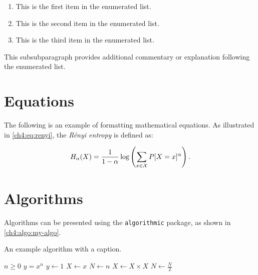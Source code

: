 \begin{enumerate}[itemindent=\subsubparitemindent]
    \item This is the first item in the enumerated list.
    \item This is the second item in the enumerated list.
    \item This is the third item in the enumerated list.
\end{enumerate}

\begin{subsubparagraph}
This subsubparagraph provides additional commentary or explanation following the enumerated list.
\end{subsubparagraph}
    

\section{Equations}
\begin{paragraph}
The following is an example of formatting mathematical equations. As illustrated in \autoref{ch4:eq:renyi}, the {\em R\'enyi entropy} is defined as:
\end{paragraph}

\begin{equation}
\label{ch4:eq:renyi}
H_{\alpha}(X) =
\frac{1}{1-\alpha}
\log \left(\sum_{x \in {\cal X}}P[X=x]^{\alpha} \right) .
\end{equation}

\section{Algorithms}
\begin{paragraph}
Algorithms can be presented using the \texttt{algorithmic} package, as shown in \autoref{ch4:algo:my-algo}.
\end{paragraph}

\begin{algorithm}[h]
\caption{An example algorithm with a caption.}
\label{ch4:algo:my-algo}
\normalsize\singlespacing
\begin{algorithmic}[1]
    \Require $n \geq 0$
    \Ensure $y = x^n$
    \State $y \gets 1$
    \State $X \gets x$
    \State $N \gets n$
            \State $X \gets X \times X$
            \State $N \gets \frac{N}{2}$ 
    \EndWhile
\end{algorithmic}
\end{algorithm}

